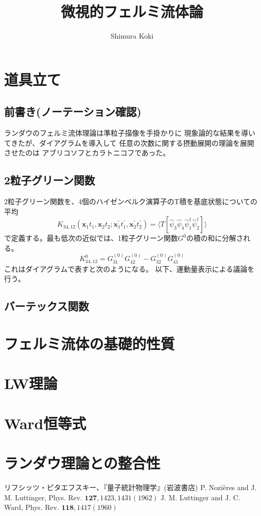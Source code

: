 \documentclass[11pt,a4j]{jarticle}
\title{微視的フェルミ流体論}
\author{Shimura Koki}
\date{}
\begin{document}
\maketitle
\section{道具立て}
\subsection{前書き(ノーテーション確認)}
ランダウのフェルミ流体理論は準粒子描像を手掛かりに
現象論的な結果を導いてきたが、ダイアグラムを導入して
任意の次数に関する摂動展開の理論を展開させたのは
アブリコソフとカラトニコフであった。

\subsection{2粒子グリーン関数}
2粒子グリーン関数を、4個のハイゼンベルク演算子のT積を基底状態についての
平均
\begin{equation}
    K_{34,12}(\bm{x}_1t_1,\bm{x}_2t_2;\bm{x}^{'}_1t^{'}_1,\bm{x}^{'}_2t^{'}_2) =
     \langle T [\hat{\psi}_3 \hat{\psi}_4 \hat{\psi}^{\dagger}_1\hat{\psi}^{\dagger}_2]\rangle
\end{equation}
で定義する。最も低次の近似では、1粒子グリーン関数$G^{0}$の積の和に分解される。
\begin{equation}
    K_{34,12}^{0} = G_{31}^{(0)}G_{42}^{(0)} - G_{32}^{(0)}G_{41}^{(0)} 
\end{equation}
これはダイアグラムで表すと次のようになる。
以下、運動量表示による議論を行う。

\subsection{バーテックス関数}

\section{フェルミ流体の基礎的性質}

\section{LW理論}

\section{Ward恒等式}

\section{ランダウ理論との整合性}


\begin{thebibliography}{99}
     リフシッツ・ピタエフスキー、『量子統計物理学』(岩波書店)
    P. Nozières and J. M. Luttinger, Phys. Rev. $\bm{127}, 1423, 1431(1962)$
    J. M. Luttinger and J. C. Ward, Phys. Rev. $\bm{118}, 1417(1960)$
\end{thebibliography}
\end{document}
